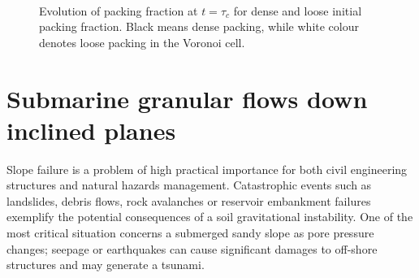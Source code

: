 \begin{figure}
\centering
{}\\
\caption{Evolution of packing fraction at $t = \tau_c$ for dense and loose 
initial packing fraction. Black means dense packing, while white colour denotes 
loose packing in the Voronoi cell.}
\label{fig:Dense_Loose_voro}
\end{figure}

\clearpage


\section{Submarine granular flows down inclined planes}

Slope failure is a problem of high practical importance for both civil 
engineering structures and natural hazards management. Catastrophic events such 
as landslides, debris flows, rock avalanches or reservoir embankment failures 
exemplify the potential consequences of a soil gravitational instability. One 
of the most critical situation concerns a submerged sandy slope as pore 
pressure changes; seepage or earthquakes can cause significant damages to 
off-shore structures and may generate a tsunami.


